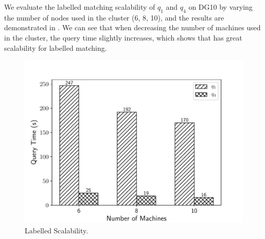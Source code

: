  We evaluate the labelled matching scalability of $q_1$ and $q_4$ on DG10 by varying the number of nodes used in the cluster (6, 8, 10), and the results are demonstrated in . We can see that when decreasing the number of machines used in the cluster, the query time slightly increases, which shows that \gencliqjoin has great scalability for labelled matching.

\begin{figure}[htb]
  \centering
  \includegraphics[scale=0.4]{figures/exp5.pdf}
  \caption{\small{Labelled Scalability.}}
  \label{fig:l_sca}
\end{figure}